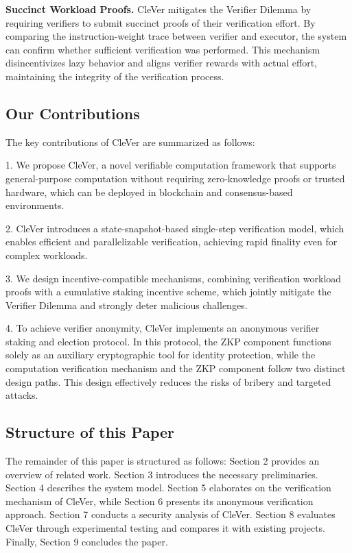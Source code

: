 \documentclass[3p]{elsarticle}
\theoremstyle{remark}
\begin{document}
\textbf{Succinct Workload Proofs.}  
CleVer mitigates the Verifier Dilemma by requiring verifiers to submit succinct proofs of their verification effort. By comparing the instruction-weight trace between verifier and executor, the system can confirm whether sufficient verification was performed. This mechanism disincentivizes lazy behavior and aligns verifier rewards with actual effort, maintaining the integrity of the verification process.

\subsection{Our Contributions}

The key contributions of CleVer are summarized as follows:

1. We propose CleVer, a novel verifiable computation framework that supports general-purpose computation without requiring zero-knowledge proofs or trusted hardware, which can be deployed in blockchain and consensus-based environments.

2. CleVer introduces a state-snapshot-based single-step verification model, which enables efficient and parallelizable verification, achieving rapid finality even for complex workloads.

3. We design incentive-compatible mechanisms, combining verification workload proofs with a cumulative staking incentive scheme, which jointly mitigate the Verifier Dilemma and strongly deter malicious challenges.

4. To achieve verifier anonymity, CleVer implements an anonymous verifier staking and election protocol. In this protocol, the ZKP component functions solely as an auxiliary cryptographic tool for identity protection, while the computation verification mechanism and the ZKP component follow two distinct design paths. This design effectively reduces the risks of bribery and targeted attacks.

\subsection{Structure of this Paper}

The remainder of this paper is structured as follows: Section 2 provides an overview of related work. Section 3 introduces the necessary preliminaries. Section 4 describes the system model. Section 5 elaborates on the verification mechanism of CleVer, while Section 6 presents its anonymous verification approach. Section 7 conducts a security analysis of CleVer. Section 8 evaluates CleVer through experimental testing and compares it with existing projects. Finally, Section 9 concludes the paper.
\end{document}
